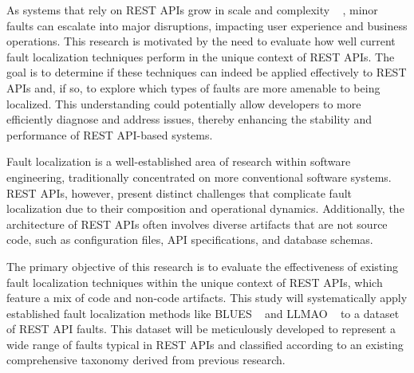 \documentclass[conference]{IEEEtran}
\newcommand{\todo}[1]{\textcolor{red}{{\bfseries [[#1]]}}}
\begin{document}

    As systems that rely on REST APIs grow in scale and complexity  ~\cite{khare2004} , minor faults can escalate into major disruptions, impacting user experience and business operations. 
    This research is motivated by the need to evaluate how well current fault localization techniques perform in the unique context of REST APIs. 
    The goal is to determine if these techniques can indeed be applied effectively to REST APIs and, if so, to explore which types of faults are more amenable to being localized. 
    This understanding could potentially allow developers to more efficiently diagnose and address issues, thereby enhancing the stability and performance of REST API-based systems.




    Fault localization is a well-established area of research within software engineering, traditionally concentrated on more conventional software systems. 
    REST APIs, however, present distinct challenges that complicate fault localization due to their composition and operational dynamics. 
    Additionally, the architecture of REST APIs often involves diverse artifacts that are not source code, such as configuration files, API specifications, and database schemas.



    The primary objective of this research is to evaluate the effectiveness of existing fault localization techniques within the unique context of REST APIs, which feature a mix of code and non-code artifacts. 
    This study will systematically apply established fault localization methods like BLUES ~\cite{ManishBluesFaultLocalization} and LLMAO ~\cite{LLMAOFaultLocalization} to a dataset of REST API faults. 
    This dataset will be meticulously developed to represent a wide range of faults typical in REST APIs and classified according to an existing comprehensive taxonomy derived from previous research.
\end{document}

